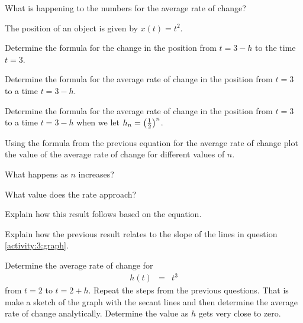 \begin{problem}
\begin{subproblem}
    \item What is happening to the numbers for the average rate of change?

  \end{subproblem}

  \clearpage

\item The position of an object is given by $x(t)=t^2$.
  \begin{subproblem}
    \item Determine the formula for the change in the position from
      $t=3-h$ to the time $t=3$.
      \vfill

    \item Determine the formula for the average rate of change in the
      position from $t=3$ to a time $t=3-h$.
      \vfill

    \item Determine the formula for the average rate of change in the
      position from $t=3$ to a time $t=3-h$ when we let $h_n=\left(\frac{1}{2}\right)^n$.

      \vspace{3em}

  \end{subproblem}


  \clearpage

\item Using the formula from the previous equation for the average
  rate of change plot the value of the average rate of change for
  different values of $n$.

  \scalebox{0.7}{}

  \begin{subproblem}
    \item What happens as $n$ increases?
      \vspace{3em}
    \item What value does the rate approach?
      \vspace{3em}
    \item Explain how this result follows based on the equation.
      \vspace{3em}
  \end{subproblem}

  \item Explain how the previous result relates to the slope of the
    lines in question \ref{activity:3:graph}.

    \vfill

  \clearpage

  \item Determine the average rate of change for
    \begin{eqnarray*}
      h(t) & = & t^3
    \end{eqnarray*}
    from $t=2$ to $t=2+h$. Repeat the steps from the previous questions.
    That is make a sketch of the graph with the secant lines and then
    determine the average rate of change analytically. Determine the
    value as $h$ gets very close to zero.

    \vfill

\end{problem}

